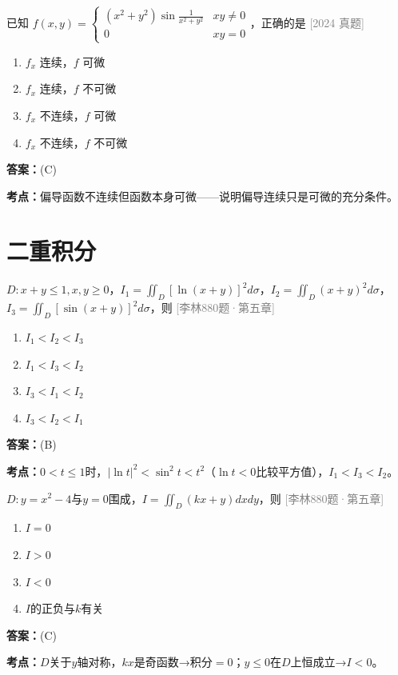 \documentclass[12pt,a4paper]{ctexbook}
\newcommand{\src}[1]{\hfill\textcolor{gray}{\small\textsf{[#1]}}}
\newcommand{\ans}[1]{\begin{answerbox}\textbf{答案：}#1\end{answerbox}}
\newcommand{\kpt}[1]{\textbf{考点：}#1}
\begin{document}
\begin{exercise}
已知 $f(x,y)=\begin{cases}(x^2+y^2)\sin\frac{1}{x^2+y^2}&xy\neq 0\\0&xy=0\end{cases}$，正确的是 \hfill\src{2024 真题}
\begin{enumerate}[label=(\Alph*),nosep]
  \item $f_x$ 连续，$f$ 可微
  \item $f_x$ 连续，$f$ 不可微
  \item $f_x$ 不连续，$f$ 可微
  \item $f_x$ 不连续，$f$ 不可微
\end{enumerate}
\end{exercise}
\ans{(C)}
\kpt{偏导函数不连续但函数本身可微——说明偏导连续只是可微的充分条件。}

\newpage

\chapter{二重积分}

\begin{exercise}[880题·比较二重积分大小]
$D:x+y\leqslant 1,x,y\geqslant 0$，$I_1=\iint_D[\ln(x+y)]^2d\sigma$，$I_2=\iint_D(x+y)^2d\sigma$，$I_3=\iint_D[\sin(x+y)]^2d\sigma$，则 \hfill\src{李林880题·第五章}
\begin{enumerate}[label=(\Alph*),nosep]
  \item $I_1<I_2<I_3$
  \item $I_1<I_3<I_2$
  \item $I_3<I_1<I_2$
  \item $I_3<I_2<I_1$
\end{enumerate}
\end{exercise}
\ans{(B)}
\kpt{$0<t\leqslant 1$时，$|\ln t|^2<\sin^2t<t^2$（$\ln t<0$比较平方值），$I_1<I_3<I_2$。}

\bigskip

\begin{exercise}[880题·对称性与奇偶性]
$D:y=x^2-4$与$y=0$围成，$I=\iint_D(kx+y)dxdy$，则 \hfill\src{李林880题·第五章}
\begin{enumerate}[label=(\Alph*),nosep]
  \item $I=0$
  \item $I>0$
  \item $I<0$
  \item $I$的正负与$k$有关
\end{enumerate}
\end{exercise}
\ans{(C)}
\kpt{$D$关于$y$轴对称，$kx$是奇函数→积分$=0$；$y\leqslant 0$在$D$上恒成立→$I<0$。}
\end{document}
